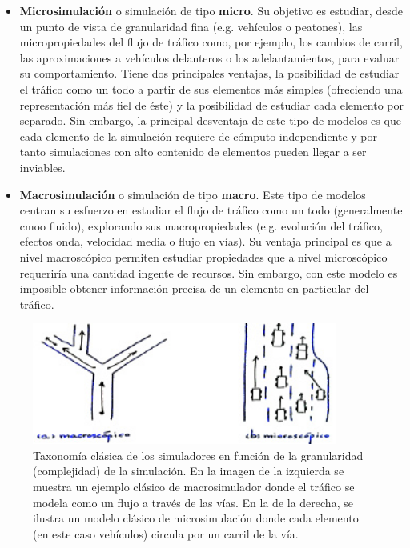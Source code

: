 \begin{itemize}
	\item \textbf{Microsimulación} o simulación de tipo \textbf{micro}. Su objetivo es estudiar, desde un punto de vista de granularidad fina (e.g. vehículos o peatones), las micropropiedades del flujo de tráfico como, por ejemplo, los cambios de carril, las aproximaciones a vehículos delanteros o los adelantamientos, para evaluar su comportamiento. Tiene dos principales ventajas, la posibilidad de estudiar el tráfico como un todo a partir de sus elementos más simples (ofreciendo una representación más fiel de éste) y la posibilidad de estudiar cada elemento por separado. Sin embargo, la principal desventaja de este tipo de modelos es que cada elemento de la simulación requiere de cómputo independiente y por tanto simulaciones con alto contenido de elementos pueden llegar a ser inviables.
	\item \textbf{Macrosimulación} o simulación de tipo \textbf{macro}. Este tipo de modelos centran su esfuerzo en estudiar el flujo de tráfico como un todo (generalmente cmoo fluido), explorando sus macropropiedades (e.g. evolución del tráfico, efectos onda, velocidad media o flujo en vías). Su ventaja principal es que a nivel macroscópico permiten estudiar propiedades que a nivel microscópico requeriría una cantidad ingente de recursos. Sin embargo, con este modelo es imposible obtener información precisa de un elemento en particular del tráfico.
\end{itemize}

\begin{figure}
	\centering
	\includegraphics[width=10cm]{images/granularities-in-traffic-simulation}
	\caption{Taxonomía clásica de los simuladores en función de la granularidad (complejidad) de la simulación. En la imagen de la izquierda se muestra un ejemplo clásico de macrosimulador donde el tráfico se modela como un flujo a través de las vías. En la de la derecha, se ilustra un modelo clásico de microsimulación donde cada elemento (en este caso vehículos) circula por un carril de la vía.}
	\label{fig:granularities-in-traffic-simulation}
\end{figure}

